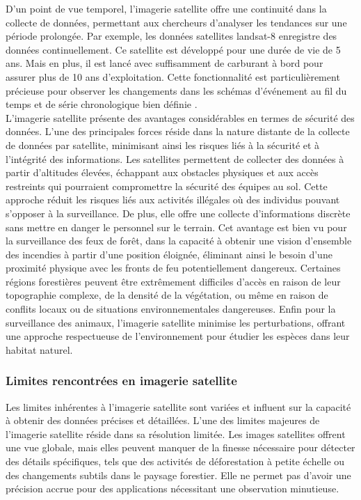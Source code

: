 D'un point de vue temporel, l'imagerie satellite offre une continuité dans la collecte de données, permettant aux chercheurs d'analyser les tendances sur une période prolongée. Par exemple, les données satellites landsat-8 enregistre des données continuellement. Ce satellite est développé pour une durée de vie de 5 ans. Mais en plus, il est lancé avec suffisamment de carburant à bord pour assurer plus de 10 ans d'exploitation. Cette fonctionnalité est particulièrement précieuse pour observer les changements dans les schémas d’événement au fil du temps et de série chronologique bien définie \cite{40}.
\\
L'imagerie satellite présente des avantages considérables en termes de sécurité des données. L'une des principales forces réside dans la nature distante de la collecte de données par satellite, minimisant ainsi les risques liés à la sécurité et à l'intégrité des informations. Les satellites permettent de collecter des données à partir d'altitudes élevées, échappant aux obstacles physiques et aux accès restreints qui pourraient compromettre la sécurité des équipes au sol. Cette approche réduit les risques liés aux activités illégales où des individus pouvant s'opposer à la surveillance. De plus, elle offre une collecte d'informations discrète sans mettre en danger le personnel sur le terrain.
Cet avantage est bien vu pour la surveillance des feux de forêt, dans la capacité à obtenir une vision d'ensemble des incendies à partir d'une position éloignée, éliminant ainsi le besoin d'une proximité physique avec les fronts de feu potentiellement dangereux. Certaines régions forestières peuvent être extrêmement difficiles d'accès en raison de leur topographie complexe, de la densité de la végétation, ou même en raison de conflits locaux ou de situations environnementales dangereuses. Enfin pour la surveillance des animaux, l'imagerie satellite minimise les perturbations, offrant une approche respectueuse de l'environnement pour étudier les espèces dans leur habitat naturel.

\subsubsection{Limites rencontrées en imagerie satellite}
Les limites inhérentes à l'imagerie satellite sont variées et influent sur la capacité à obtenir des données précises et détaillées. L'une des limites majeures de l'imagerie satellite réside dans sa résolution limitée. Les images satellites offrent une vue globale, mais elles peuvent manquer de la finesse nécessaire pour détecter des détails spécifiques, tels que des activités de déforestation à petite échelle ou des changements subtils dans le paysage forestier. Elle ne permet pas d’avoir une précision accrue pour des applications nécessitant une observation minutieuse.
\\

